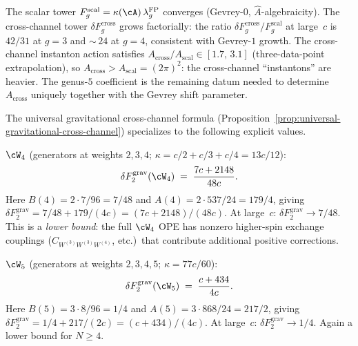\begin{remark}

\label{rem:cross-channel-resurgence}
The scalar tower $F_g^{\mathrm{scal}} = \kappa(\cA)\,\lambda_g^{\mathrm{FP}}$ converges (Gevrey-$0$, $\hat{A}$-algebraicity). The cross-channel
tower $\delta F_g^{\mathrm{cross}}$ grows factorially: the ratio
$\delta F_g^{\mathrm{cross}} / F_g^{\mathrm{scal}}$ at large~$c$
is $42/31$ at $g = 3$ and ${\sim}\,24$ at $g = 4$, consistent
with Gevrey-$1$ growth. The cross-channel instanton action satisfies
$A_{\mathrm{cross}} / A_{\mathrm{scal}} \in [1.7,\, 3.1]$
(three-data-point extrapolation), so
$A_{\mathrm{cross}} > A_{\mathrm{scal}} = (2\pi)^2$: the
cross-channel ``instantons'' are heavier. The genus-$5$ coefficient
is the remaining datum needed to determine $A_{\mathrm{cross}}$
uniquely together with the Gevrey shift parameter.
\end{remark}

\begin{computation}%
\label{comp:w4-w5-grav-cross}%
%
%
%
%
The universal gravitational cross-channel formula
(Proposition~\ref{prop:universal-gravitational-cross-channel})
specializes to the following explicit values.

\smallskip\noindent
\emph{$\cW_4$} \textup{(}generators at weights $2, 3, 4$;
$\kappa = c/2 + c/3 + c/4 = 13c/12$\textup{)}:
\begin{equation}\label{eq:w4-genus2-grav}
\delta F_2^{\mathrm{grav}}(\cW_4)
\;=\;
\frac{7c + 2148}{48c}.
\end{equation}
Here $B(4) = 2 \cdot 7/96 = 7/48$ and
$A(4) = 2 \cdot 537/24 = 179/4$, giving
$\delta F_2^{\mathrm{grav}} = 7/48 + 179/(4c)
= (7c + 2148)/(48c)$.
At large~$c$: $\delta F_2^{\mathrm{grav}} \to 7/48$.
This is a \emph{lower bound}: the full $\cW_4$ OPE has
nonzero higher-spin exchange couplings
($C_{W^{(3)}W^{(3)}W^{(4)}}$, etc.)\ that
contribute additional positive corrections.

\smallskip\noindent
\emph{$\cW_5$} \textup{(}generators at weights $2, 3, 4, 5$;
$\kappa = 77c/60$\textup{)}:
\begin{equation}\label{eq:w5-genus2-grav}
\delta F_2^{\mathrm{grav}}(\cW_5)
\;=\;
\frac{c + 434}{4c}.
\end{equation}
Here $B(5) = 3 \cdot 8/96 = 1/4$ and
$A(5) = 3 \cdot 868/24 = 217/2$, giving
$\delta F_2^{\mathrm{grav}} = 1/4 + 217/(2c)
= (c + 434)/(4c)$.
At large~$c$: $\delta F_2^{\mathrm{grav}} \to 1/4$.
Again a lower bound for $N \geq 4$.
\end{computation}

